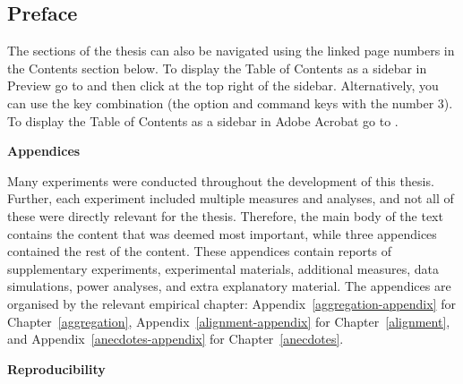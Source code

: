\documentclass[a4paper, nobind]{templates/ociamthesis}
\newenvironment{preface}%
{   \begin{alwayssingle}\chapter*{Preface}
    \thispagestyle{empty}
    \pagestyle{empty}
    \setlength{\baselineskip}{\frontmatterbaselineskip}
  }
  {\end{alwayssingle}}
\theoremstyle{definition}
\theoremstyle{definition}
\theoremstyle{definition}
\theoremstyle{definition}
\theoremstyle{remark}
\begin{document}
\begin{romanpages}
\begin{preface}
  The sections of the thesis can also be navigated using the linked page numbers
  in the Contents section below. To display the Table of Contents as a sidebar in
  Preview go to  and then click  at the
  top right of the sidebar. Alternatively, you can use the key combination
   (the option and command keys with the number 3). To
  display the Table of Contents as a sidebar in Adobe Acrobat go to .

  \hfill\break

  \noindent \textbf{Appendices}

  Many experiments were conducted throughout the development of this thesis.
  Further, each experiment included multiple measures and analyses, and not all of
  these were directly relevant for the thesis. Therefore, the main body of the
  text contains the content that was deemed most important, while three appendices
  contained the rest of the content. These appendices contain reports of
  supplementary experiments, experimental materials, additional measures, data
  simulations, power analyses, and extra explanatory material. The appendices are
  organised by the relevant empirical chapter:
  Appendix~\ref{aggregation-appendix} for Chapter~\ref{aggregation},
  Appendix~\ref{alignment-appendix} for Chapter~\ref{alignment}, and
  Appendix~\ref{anecdotes-appendix} for Chapter~\ref{anecdotes}.

  \hfill\break

  \noindent \textbf{Reproducibility}


\end{preface}
\end{romanpages}
\end{document}
